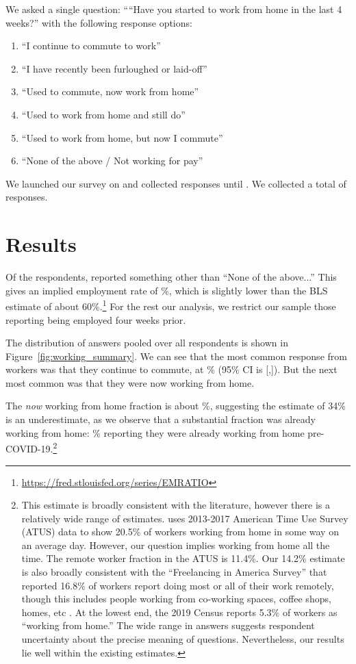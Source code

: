 \documentclass[12pt]{article}
\begin{document}
We asked a single question:
````Have you started to work from home in the last 4 weeks?''
with the following response options: 
\begin{enumerate} 
\item ``I continue to commute to work''
\item ``I have recently been furloughed or laid-off''
\item ``Used to commute, now work from home''   
\item ``Used to work from home and still do''       
\item ``Used to work from home, but now I commute''
\item ``None of the above / Not working for pay''
\end{enumerate} 

We launched our survey on \SurveyStart{} and collected responses until \SurveyEnd{}. 
We collected a total of \numObs{} responses.

\section{Results}

Of the respondents, \numObsWorking{} reported something other than ``None of the above...''
This gives an implied employment rate of \LFPRhat{}\%, which is slightly lower than the BLS estimate of about 60\%.\footnote{
  \url{https://fred.stlouisfed.org/series/EMRATIO}
}
For the rest our analysis, we restrict our sample those reporting being employed four weeks prior.

The distribution of answers pooled over all respondents is shown in Figure~\ref{fig:working_summary}. 
We can see that the most common response from workers was that they continue to commute, at \stillCommute{}\% (95\% CI is [\stillCommuteLB,\stillCommuteUB]). 
But the next most common was that they were now working from home. 

The \emph{now} working from home fraction is about \WFH{}\%, suggesting the \cite{dingel2020} estimate of 34\% is an underestimate, as we observe that a substantial fraction was already working from home: \alreadyWFH{}\% reporting they were already working from home pre-COVID-19.\footnote{
This estimate is broadly consistent with the literature, however there is a relatively wide range of estimates.
\cite{krantz2019did} uses 2013-2017 American Time Use Survey (ATUS) data to show 20.5\% of workers working from home in some way on an average day.
However, our question implies working from home all the time.
The remote worker fraction in the ATUS is 11.4\%.
Our 14.2\% estimate is also broadly consistent with the ``Freelancing in America Survey'' that reported 16.8\% of workers report doing most or all of their work remotely, though this includes people working from co-working spaces, coffee shops, homes, etc \citep{ozimek2020}.
At the lowest end, the 2019 Census reports 5.3\% of workers as ``working from home.''
The wide range in answers suggests respondent uncertainty about the precise meaning of questions. Nevertheless, our results lie well within the existing estimates.
}
\end{document}

